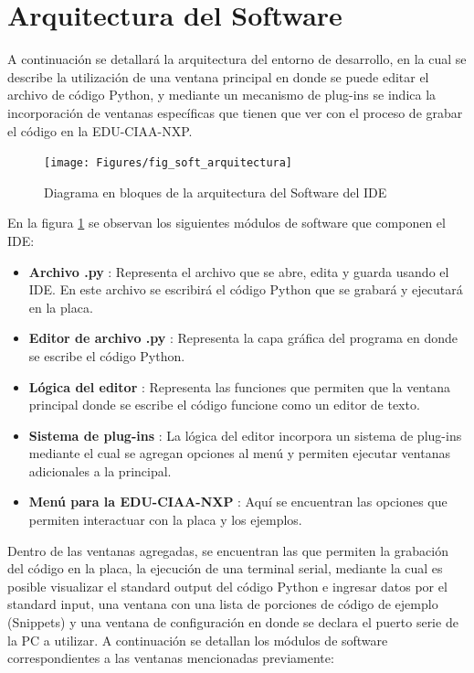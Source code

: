 
\section{Arquitectura del Software}
\label{sec:softwareArq}

A continuación se detallará la arquitectura del entorno de desarrollo, en la cual se describe la utilización de una ventana principal en donde se puede editar el archivo de código Python, y mediante un mecanismo de plug-ins se indica la incorporación de ventanas específicas que tienen que ver con el proceso de grabar el código en la EDU-CIAA-NXP. 

\begin{figure}[ht]
  \centering
    \texttt{[image: Figures/fig\_soft\_arquitectura]}
  \caption{Diagrama en bloques de la arquitectura del Software del IDE}
  \label{fig:softwareArq}
\end{figure}

En la figura \ref{fig:softwareArq} se observan los siguientes módulos de software que componen el IDE:

\begin{itemize}
	\item \textbf{Archivo .py} : Representa el archivo que se abre, edita y guarda usando el IDE. En este archivo se escribirá el código Python que se grabará y ejecutará en la placa.
	\item \textbf{Editor de archivo .py} : Representa la capa gráfica del programa en donde se escribe el código Python.
	\item \textbf{Lógica del editor} : Representa las funciones que permiten que la ventana principal donde se escribe el código funcione como un editor de texto.
	\item \textbf{Sistema de plug-ins} : La lógica del editor incorpora un sistema de plug-ins mediante el cual se agregan opciones al menú y permiten ejecutar ventanas adicionales a la principal.
	\item \textbf{Menú para la EDU-CIAA-NXP} : Aquí se encuentran las opciones que permiten interactuar con la placa y los ejemplos.
\end{itemize}

Dentro de las ventanas agregadas, se encuentran las que permiten la grabación del código en la placa, la ejecución de una terminal serial, mediante la cual es posible visualizar el standard output del código Python e ingresar datos por el standard input, una ventana con una lista de porciones de código de ejemplo (Snippets) y una ventana de configuración en donde se declara el puerto serie de la PC a utilizar.
A continuación se detallan los módulos de software correspondientes a las ventanas mencionadas previamente:

